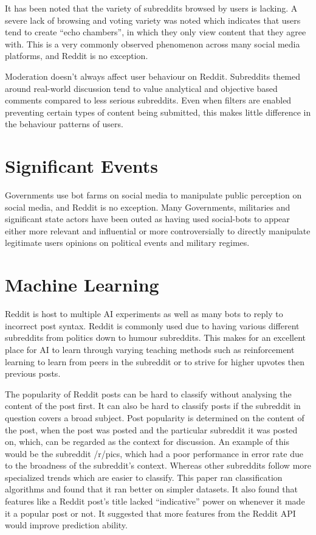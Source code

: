 It has been noted that the variety of subreddits browsed by users is lacking. A severe lack of browsing and voting variety was noted which indicates that users tend to create “echo chambers”, in which they only view content that they agree with. \cite{8} This is a very commonly observed phenomenon across many social media platforms, and Reddit is no exception. \cite{8}

Moderation doesn’t always affect user behaviour on Reddit. Subreddits themed around real-world discussion tend to value analytical and objective based comments compared to less serious subreddits. Even when filters are enabled preventing certain types of content being submitted, this makes little difference in the behaviour patterns of users.

\section{Significant Events}
Governments use bot farms on social media to manipulate public perception on social media, and Reddit is no exception. Many Governments, militaries and significant state actors have been outed as having used social-bots to appear either more relevant and influential or more controversially to directly manipulate legitimate users opinions on political events and military regimes. \cite{5}

\section{Machine Learning}
Reddit is host to multiple AI experiments as well as many bots to reply to incorrect post syntax. Reddit is commonly used due to having various different subreddits from politics down to humour subreddits. This makes for an excellent place for AI to learn through varying teaching methods such as reinforcement learning to learn from peers in the subreddit or to strive for higher upvotes then previous posts. \cite{1}
	
The popularity of Reddit posts can be hard to classify without analysing the content of the post first. It can also be hard to classify posts if the subreddit in question covers a broad subject. Post popularity is determined on the content of the post, when the post was posted and the particular subreddit it was posted on, which, can be regarded as the context for discussion. An example of this would be the subreddit /r/pics, which had a poor performance in error rate due to the broadness of the subreddit’s context. Whereas other subreddits follow more specialized trends which are easier to classify. This paper ran classification algorithms and found that it ran better on simpler datasets. It also found that features like a Reddit post’s title lacked “indicative” power on whenever it made it a popular post or not. It suggested that more features from the Reddit API would improve prediction ability. \cite{6}

